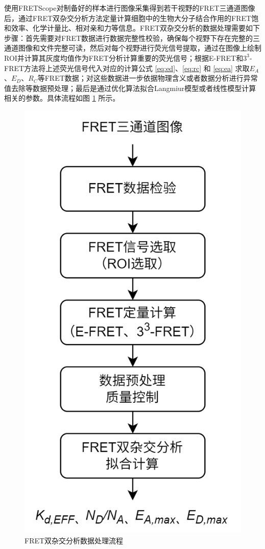 使用FRETScope对制备好的样本进行图像采集得到若干视野的FRET三通道图像后，通过FRET双杂交分析方法定量计算细胞中的生物大分子结合作用的FRET饱和效率、化学计量比、相对亲和力等信息。FRET双杂交分析的数据处理需要如下步骤：首先需要对FRET数据进行数据完整性校验，确保每个视野下存在完整的三通道图像和文件完整可读，然后对每个视野进行荧光信号提取，通过在图像上绘制ROI并计算其灰度均值作为FRET分析计算重要的荧光信号；根据E-FRET和$3^3$-FRET方法将上述荧光信号代入对应的计算公式 \ref{eq:ed}、\ref{eq:rc} 和 \ref{eq:ea} 求取$E_A$、$E_D$、$R_C$等FRET数据；对这些数据进一步依据物理含义或者数据分析进行异常值去除等数据预处理；最后是通过优化算法拟合Langmiur模型或者线性模型计算相关的参数。具体流程如图 \ref{fig:tha_data_process} 所示。
\begin{figure}[hbtp]
    \centering
    \includegraphics[width=0.4\linewidth]{../figures/2/双杂交数据处理流程.drawio.png}
    \caption{FRET双杂交分析数据处理流程}
    \label{fig:tha_data_process}
\end{figure}

